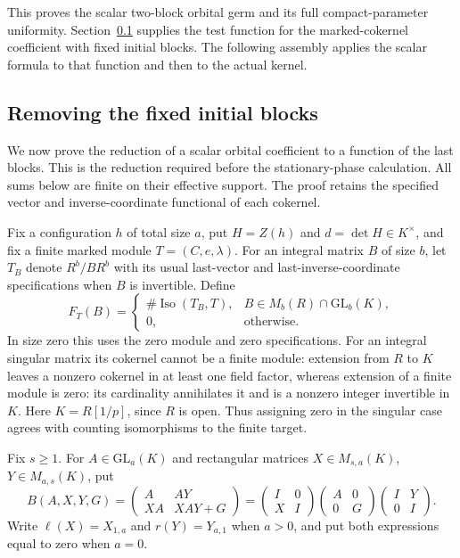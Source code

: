 This proves the scalar two-block orbital germ and its full
compact-parameter uniformity.  Section~\ref{hr-section} supplies
the test function for the marked-cokernel coefficient with fixed
initial blocks.  The following assembly applies the scalar
formula to that function and then to the actual kernel.


\subsection{Removing the fixed initial blocks}
\label{hr-section}

We now prove the reduction of a scalar orbital coefficient to a
function of the last blocks. This is the reduction required before
the stationary-phase calculation. All sums below are finite on their
effective support. The proof retains the specified vector and
inverse-coordinate functional of each cokernel.

Fix a configuration $h$ of total size $a$, put $H=Z(h)$ and
$d=\det H\in K^\times$, and fix a finite marked module
$T=(C,e,\lambda)$. For an integral matrix $B$ of size $b$, let
$T_B$ denote $R^b/BR^b$ with its usual last-vector and
last-inverse-coordinate specifications when $B$ is invertible.
Define
\[
 F_T(B)=
 \begin{cases}
 \#\operatorname{Iso}(T_B,T),&B\in M_b(R)\cap\mathrm{GL}_b(K),\\
 0,&\text{otherwise}.
 \end{cases}
\]
In size zero this uses the zero module and zero specifications.
For an integral singular matrix its cokernel cannot be a finite
module: extension from $R$ to $K$ leaves a nonzero cokernel in at
least one field factor, whereas extension of a finite module is zero:
its cardinality annihilates it and is a nonzero integer invertible in $K$.
Here $K=R[1/p]$, since $R$ is open. Thus assigning zero in the
singular case agrees with counting isomorphisms to the finite target.

Fix $s\ge1$. For $A\in\mathrm{GL}_a(K)$ and rectangular matrices
$X\in M_{s,a}(K)$, $Y\in M_{a,s}(K)$, put
\begin{equation}\label{hr-block-matrix}
 B(A,X,Y,G)=
 \begin{pmatrix}A&AY\\ XA&XAY+G\end{pmatrix}
 =\begin{pmatrix}I&0\\X&I\end{pmatrix}
   \begin{pmatrix}A&0\\0&G\end{pmatrix}
   \begin{pmatrix}I&Y\\0&I\end{pmatrix}.
\end{equation}
Write $\ell(X)=X_{1,a}$ and $r(Y)=Y_{a,1}$ when $a>0$,
and put both expressions equal to zero when $a=0$.

